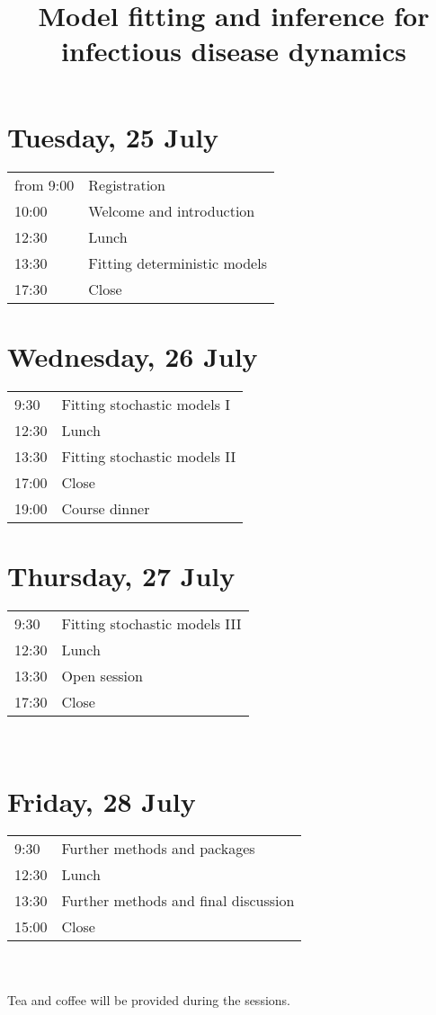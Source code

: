 \documentclass[a4paper]{article}
\title{Model fitting and inference for\\infectious disease dynamics}
\author{}
\date{}
\begin{document}
\maketitle

\section*{Tuesday, 25 July}
\label{sec:tuesday}

\begin{tabular}{R{1.5cm} l}
from 9:00 & Registration\\
10:00 & Welcome and introduction\\
12:30 & Lunch\\
13:30 & Fitting deterministic models\\
17:30 & Close\\
\end{tabular}

\section*{Wednesday, 26 July}
\label{sec:wednesday}
\begin{tabular}{R{1.5cm} l}
9:30 & Fitting stochastic models I\\
12:30 & Lunch\\
13:30 & Fitting stochastic models II\\
17:00 & Close\\
19:00 & Course dinner
\end{tabular}

\section*{Thursday, 27 July}
\label{sec:thursday}
\begin{tabular}{R{1.5cm} l}
9:30 & Fitting stochastic models III\\
12:30 & Lunch\\
13:30 & Open session\\
17:30 & Close\\
\end{tabular}\\

\section*{Friday, 28 July}
\label{sec:thursday}
\begin{tabular}{R{1.5cm} l}
9:30 & Further methods and packages\\
12:30 & Lunch\\
13:30 & Further methods and final discussion\\
15:00 & Close\\
\end{tabular}\\
\vspace{0.5cm}\\
Tea and coffee will be provided during the sessions.
\end{document}
